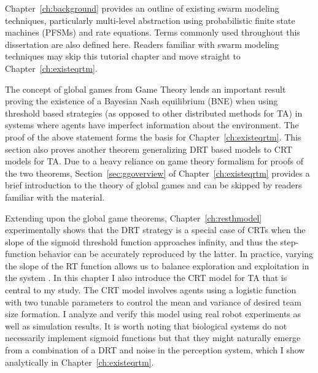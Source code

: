 \documentclass[defaultstyle,12pt]{thesis}
\begin{document}
Chapter~\ref{ch:background} provides an outline of existing swarm modeling techniques, particularly multi-level abstraction using probabilistic finite state machines (PFSMs) and rate equations. Terms commonly used throughout this dissertation are also defined here. Readers familiar with swarm modeling techniques may skip this tutorial chapter and move straight to Chapter~\ref{ch:existeqrtm}. 



The concept of global games from Game Theory lends an important result proving the existence of a Bayesian Nash equilibrium (BNE) when using threshold based strategies (as opposed to other distributed methods for TA) in systems where agents have imperfect information about the environment. The proof of the above statement forms the basis for Chapter~\ref{ch:existeqrtm}. This section also proves another theorem generalizing DRT based models to CRT models for TA. Due to a heavy reliance on game theory formalism for proofs of the two theorems, Section~\ref{sec:ggoverview} of Chapter~\ref{ch:existeqrtm} provides a brief introduction to the theory of global games and can be skipped by readers familiar with the material.

Extending upon the global game theorems, Chapter~\ref{ch:resthmodel} experimentally shows that the DRT strategy is a special case of CRTs when the slope of the sigmoid threshold function approaches infinity, and thus the step-function behavior can be accurately reproduced by the latter. In practice, varying the slope of the RT function allows us to balance exploration and exploitation in the system \cite{Bonabeau1997}. In this chapter I also introduce the CRT model for TA that is central to my study. The CRT model involves agents using a logistic function with two tunable parameters to control the mean and variance of desired team size formation. I analyze and verify this model using real robot experiments as well as simulation results. It is worth noting that biological systems do not necessarily implement sigmoid functions but that they might naturally emerge from a combination of a DRT and noise in the perception system, which I show analytically in Chapter~\ref{ch:existeqrtm}. 



\end{document}
